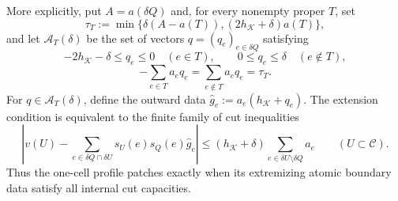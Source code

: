 \begin{theorem}
\begin{enumerate}
More explicitly, put $A=a(\delta Q)$ and, for every nonempty proper $T$, set
\[
 \tau_T:=\min\{\delta(A-a(T)),(2h_{\mathcal K}+\delta)a(T)\},
\]
and let $\mathcal A_T(\delta)$ be the set of vectors
$q=(q_e)_{e\in\delta Q}$ satisfying
\[
 -2h_{\mathcal K}-\delta\le q_e\le0\quad(e\in T),
 \qquad
 0\le q_e\le\delta\quad(e\notin T),
\]
\[
 -\sum_{e\in T}a_e q_e
 =\sum_{e\notin T}a_e q_e
 =\tau_T.
\]
For $q\in\mathcal A_T(\delta)$, define the outward data
$\widehat g_e:=a_e(h_{\mathcal K}+q_e)$.  The extension condition is
equivalent to the finite family of cut inequalities
\begin{equation}
\label{eq:patched-extension-cuts}
 \left|v(U)-\sum_{e\in\delta Q\cap\delta U}
 s_U(e)s_Q(e)\widehat g_e\right|
 \le
 (h_{\mathcal K}+\delta)
 \sum_{e\in\delta U\setminus\delta Q}a_e
 \qquad(U\subset\mathcal C).
\end{equation}
Thus the one-cell profile patches exactly when its extremizing
atomic boundary data satisfy all internal cut capacities.
\end{enumerate}
\end{theorem}

